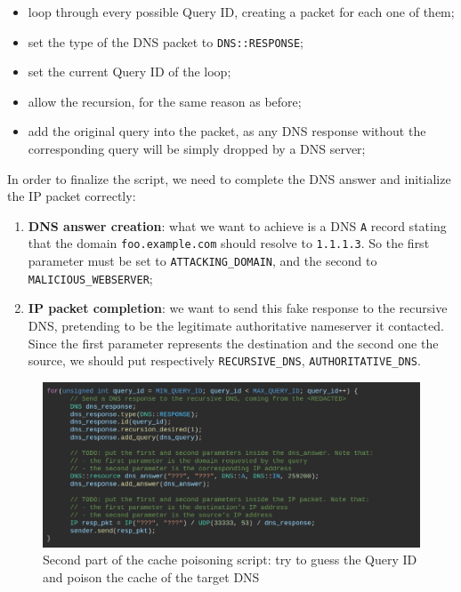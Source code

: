 \documentclass[11pt,a4paper]{article}
\begin{document}
\begin{itemize}
    \item loop through every possible Query ID, creating a packet for each one of them;
    \item set the type of the DNS packet to \texttt{DNS::RESPONSE};
    \item set the current Query ID of the loop;
    \item allow the recursion, for the same reason as before;
    \item add the original query into the packet, as any DNS response without the corresponding query will be simply dropped by a DNS server;
\end{itemize}

\noindent
In order to finalize the script, we need to complete the DNS answer and initialize the IP packet correctly:
\begin{enumerate}
    \item \textbf{DNS answer creation}: what we want to achieve is a DNS \texttt{A} record stating that the domain \texttt{foo.example.com} should resolve to \texttt{1.1.1.3}. So the first parameter must be set to \texttt{ATTACKING\_DOMAIN}, and the second to \texttt{MALICIOUS\_WEBSERVER};
    \item \textbf{IP packet completion}: we want to send this fake response to the recursive DNS, pretending to be the legitimate authoritative nameserver it contacted. Since the first parameter represents the destination and the second one the source, we should put respectively \texttt{RECURSIVE\_DNS}, \texttt{AUTHORITATIVE\_DNS}.
\end{enumerate}

\begin{figure}
    \centering
    \includegraphics[width=\textwidth]{cache-poisoning-second.png}
    \caption{Second part of the cache poisoning script: try to guess the Query ID and poison the cache of the target DNS}
    \label{fig:cache-poisoning-second}
\end{figure}
\end{document}
